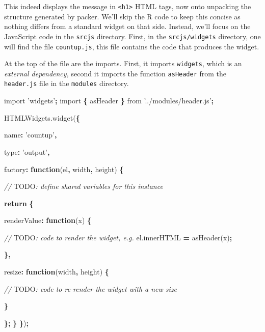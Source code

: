 \documentclass[10pt,]{krantz}
\makeatletter
\newenvironment{Shaded}{\begin{snugshade}}{\end{snugshade}}
\newcommand{\AlertTok}[1]{\textcolor[rgb]{0.33,0.33,0.33}{#1}}
\newcommand{\AttributeTok}[1]{\textcolor[rgb]{0.61,0.61,0.61}{#1}}
\newcommand{\CommentTok}[1]{\textcolor[rgb]{0.37,0.37,0.37}{\textit{#1}}}
\newcommand{\ControlFlowTok}[1]{\textcolor[rgb]{0.27,0.27,0.27}{\textbf{#1}}}
\newcommand{\DataTypeTok}[1]{\textcolor[rgb]{0.27,0.27,0.27}{#1}}
\newcommand{\ImportTok}[1]{#1}
\newcommand{\KeywordTok}[1]{\textcolor[rgb]{0.27,0.27,0.27}{\textbf{#1}}}
\newcommand{\NormalTok}[1]{#1}
\newcommand{\OperatorTok}[1]{\textcolor[rgb]{0.43,0.43,0.43}{\textbf{#1}}}
\newcommand{\StringTok}[1]{\textcolor[rgb]{0.5,0.5,0.5}{#1}}
\newcommand{\VariableTok}[1]{\textcolor[rgb]{0,0,0}{#1}}
\newenvironment{kframe}{%
\medskip{}
\setlength{\fboxsep}{.8em}
 \def\at@end@of@kframe{}%
 \ifinner\ifhmode%
  \def\at@end@of@kframe{\end{minipage}}%
  \begin{minipage}{\columnwidth}%
 \fi\fi%
 \def\FrameCommand##1{\hskip\@totalleftmargin \hskip-\fboxsep
 \colorbox{shadecolor}{##1}\hskip-\fboxsep
     \hskip-\linewidth \hskip-\@totalleftmargin \hskip\columnwidth}%
 \MakeFramed {\advance\hsize-\width
   \@totalleftmargin\z@ \linewidth\hsize
   \@setminipage}}%
 {\par\unskip\endMakeFramed%
 \at@end@of@kframe}
\renewenvironment{Shaded}{\begin{kframe}}{\end{kframe}}
\makeatother
\begin{document}
This indeed displays the message in \texttt{\textless{}h1\textgreater{}} HTML tags, now onto unpacking the structure generated by packer. We'll skip the R code to keep this concise as nothing differs from a standard widget on that side. Instead, we'll focus on the JavaScript code in the \texttt{srcjs} directory. First, in the \texttt{srcjs/widgets} directory, one will find the file \texttt{countup.js}, this file contains the code that produces the widget.

At the top of the file are the imports. First, it imports \texttt{widgets}, which is an \emph{external dependency,} second it imports the function \texttt{asHeader} from the \texttt{header.js} file in the \texttt{modules} directory.

\begin{Shaded}
\begin{Highlighting}[]
\ImportTok{import} \StringTok{'widgets'}\OperatorTok{;}
\ImportTok{import} \OperatorTok{\{}\NormalTok{ asHeader }\OperatorTok{\}} \ImportTok{from} \StringTok{'../modules/header.js'}\OperatorTok{;} 

\VariableTok{HTMLWidgets}\NormalTok{.}\AttributeTok{widget}\NormalTok{(}\OperatorTok{\{}

  \DataTypeTok{name}\OperatorTok{:} \StringTok{'countup'}\OperatorTok{,}

  \DataTypeTok{type}\OperatorTok{:} \StringTok{'output'}\OperatorTok{,}

  \DataTypeTok{factory}\OperatorTok{:} \KeywordTok{function}\NormalTok{(el}\OperatorTok{,}\NormalTok{ width}\OperatorTok{,}\NormalTok{ height) }\OperatorTok{\{}

    \CommentTok{// }\AlertTok{TODO}\CommentTok{: define shared variables for this instance}

    \ControlFlowTok{return} \OperatorTok{\{}

      \DataTypeTok{renderValue}\OperatorTok{:} \KeywordTok{function}\NormalTok{(x) }\OperatorTok{\{}

        \CommentTok{// }\AlertTok{TODO}\CommentTok{: code to render the widget, e.g.}
        \VariableTok{el}\NormalTok{.}\AttributeTok{innerHTML} \OperatorTok{=} \AttributeTok{asHeader}\NormalTok{(x)}\OperatorTok{;}

      \OperatorTok{\},}

      \DataTypeTok{resize}\OperatorTok{:} \KeywordTok{function}\NormalTok{(width}\OperatorTok{,}\NormalTok{ height) }\OperatorTok{\{}

        \CommentTok{// }\AlertTok{TODO}\CommentTok{: code to re-render the widget with a new size}

      \OperatorTok{\}}

    \OperatorTok{\};}
  \OperatorTok{\}}
\OperatorTok{\}}\NormalTok{)}\OperatorTok{;}
\end{Highlighting}
\end{Shaded}
\end{document}
